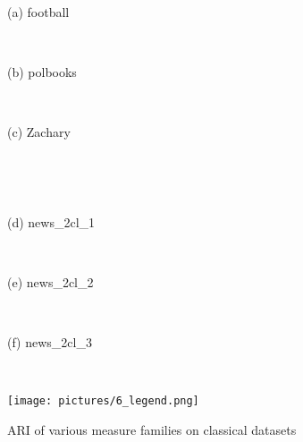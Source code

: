 \documentclass{article}
\begin{document}
\begin{figure}[H]
	\begin{minipage}{.32\textwidth}
		\\\centerline{(a) football}
	\end{minipage}
	\begin{minipage}{.32\textwidth}
		\\\centerline{(b) polbooks}
	\end{minipage}
	\begin{minipage}{.32\textwidth}
		\\\centerline{(c) Zachary}
	\end{minipage}
    \\[10pt]
	\begin{minipage}{.32\textwidth}
		\\\centerline{(d) news\_2cl\_1}
	\end{minipage}
	\begin{minipage}{.32\textwidth}
		\\\centerline{(e) news\_2cl\_2}
	\end{minipage}
	\begin{minipage}{.32\textwidth}
		\\\centerline{(f) news\_2cl\_3}
	\end{minipage}
	\\[10pt]
    \begin{minipage}{\textwidth}
        \hfill\texttt{[image: pictures/6\_legend.png]}\hfill
	\end{minipage}
  \caption{\label{f_datasets}ARI of various measure families on classical datasets}
\end{figure}
\end{document}
